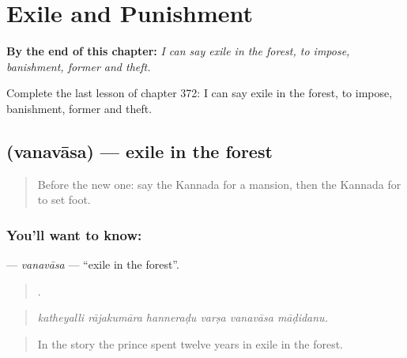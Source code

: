 
\chapter{Exile and Punishment}
\label{ch:ka-exile-and-punishment}

\begin{chapteropening}
\textbf{By the end of this chapter:} \emph{I can say exile in the forest, to impose, banishment, former and theft.}

Complete the last lesson of chapter 372: I can say exile in the forest, to impose, banishment, former and theft.
\end{chapteropening}

\section[\texorpdfstring{\kn{ವನವಾಸ} (vanavāsa)}{ವನವಾಸ (vanavāsa)}]{ (vanavāsa) — exile in the forest}

\label{lesson:KA-C372-vanavasa}



\begin{quote}
Before the new one: say the Kannada for a mansion, then the Kannada for to set foot.
\end{quote}

\subsection*{You'll want to know: }
\textbf{} — \emph{vanavāsa} — \textquotedblleft{}exile in the forest\textquotedblright{}.

\begin{quote}
     .
\end{quote}

\begin{quote}
\emph{katheyalli rājakumāra hanneraḍu varṣa vanavāsa māḍidanu.}
\end{quote}

\begin{quote}
In the story the prince spent twelve years in exile in the forest.
\end{quote}

